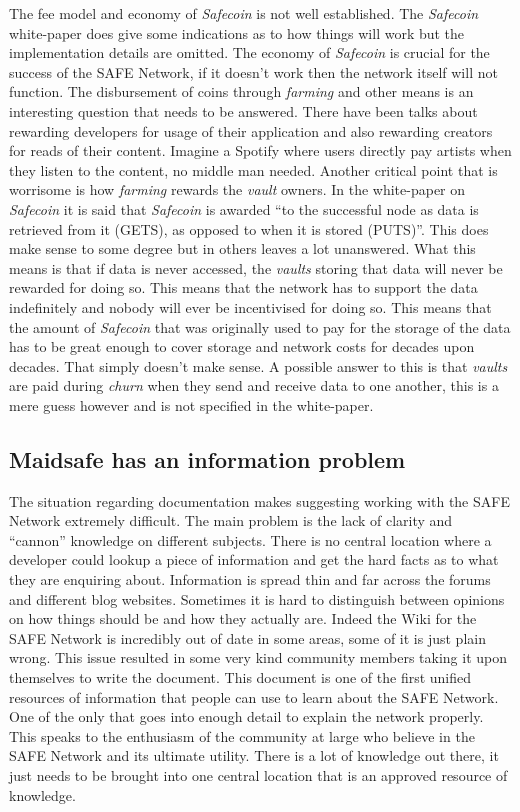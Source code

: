The fee model and economy of \textit{Safecoin} is not well established. The \textit{Safecoin} white-paper\cite{lambert2015safecoin} does give some indications as to how things will work but the implementation details are omitted. The economy of \textit{Safecoin} is crucial for the success of the SAFE Network, if it doesn't work then the network itself will not function. The disbursement of coins through \textit{farming} and other means is an interesting question that needs to be answered. There have been talks about rewarding developers for usage of their application and also rewarding creators for reads of their content. Imagine a Spotify where users directly pay artists when they listen to the content, no middle man needed. Another critical point that is worrisome is how \textit{farming} rewards the \textit{vault} owners. In the white-paper on \textit{Safecoin} it is said that \textit{Safecoin} is awarded ``to the successful node as data is retrieved from it (GETS), as opposed to when it is stored (PUTS)''. This does make sense to some degree but in others leaves a lot unanswered. What this means is that if data is never accessed, the \textit{vaults} storing that data will never be rewarded for doing so. This means that the network has to support the data indefinitely and nobody will ever be incentivised for doing so. This means that  the amount of \textit{Safecoin} that was originally used to pay for the storage of the data has to be great enough to cover storage and network costs for decades upon decades. That simply doesn't make sense. A possible answer to this is that \textit{vaults} are paid during \textit{churn} when they send and receive data to one another, this is a mere guess however and is not specified in the white-paper.

\subsection{Maidsafe has an information problem}

The situation regarding documentation makes suggesting working with the SAFE Network extremely difficult. The main problem is the lack of clarity and ``cannon'' knowledge on different subjects. There is no central location where a developer could lookup a piece of information and get the hard facts as to what they are enquiring about. Information is spread thin and far across the forums and different blog websites. Sometimes it is hard to distinguish between opinions on how things should be and how they actually are. Indeed the Wiki for the SAFE Network is incredibly out of date in some areas, some of it is just plain wrong. This issue resulted in some very kind community members taking it upon themselves to write the  document. This document is one of the first unified resources of information that people can use to learn about the SAFE Network. One of the only that goes into enough detail to explain the network properly. This speaks to the enthusiasm of the community at large who believe in the SAFE Network and its ultimate utility. There is a lot of knowledge out there, it just needs to be brought into one central location that is an approved resource of knowledge.

